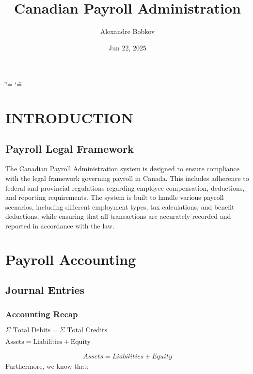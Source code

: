 \documentclass[letterpaper,10pt,english]{sphinxmanual}
\title{Canadian Payroll Administration}
\date{Jun 22, 2025}
\author{Alexandre Bobkov}
\begin{document}
\ifdefined\shorthandoff
  \ifnum\catcode`\=\string=\active\shorthandoff{=}\fi
  \ifnum\catcode`\"=\active{}\fi
\fi

\pagestyle{empty}
\sphinxmaketitle
\pagestyle{plain}
\sphinxtableofcontents
\pagestyle{normal}
\label{\detokenize{index::doc}}


\sphinxstepscope


\chapter{INTRODUCTION}
\label{\detokenize{introduction:introduction}}\label{\detokenize{introduction::doc}}

\section{Payroll Legal Framework}
\label{\detokenize{introduction:payroll-legal-framework}}
\sphinxAtStartPar
The Canadian Payroll Administration system is designed to ensure compliance with the legal framework governing payroll in Canada. This includes adherence to federal and provincial regulations regarding employee compensation, deductions, and reporting requirements.
The system is built to handle various payroll scenarios, including different employment types, tax calculations, and benefit deductions, while ensuring that all transactions are accurately recorded and reported in accordance with the law.

\sphinxstepscope


\chapter{Payroll Accounting}
\label{\detokenize{payroll_accounting:payroll-accounting}}\label{\detokenize{payroll_accounting::doc}}

\section{Journal Entries}
\label{\detokenize{payroll_accounting:journal-entries}}

\subsection{Accounting Recap}
\label{\detokenize{payroll_accounting:accounting-recap}}
\begin{center}\(\Sigma \text{ Total Debits} = \Sigma \text{ Total Credits}\)
\end{center}
\begin{center}\(\text{Assets} = \text{Liabilities} + \text{Equity}\)
\end{center}\begin{equation}\label{equation:payroll_accounting:AccountingEquation}
\begin{split}Assets = Liabilities + Equity\end{split}
\end{equation}
\sphinxAtStartPar
Furthermore, we know that:
\end{document}
